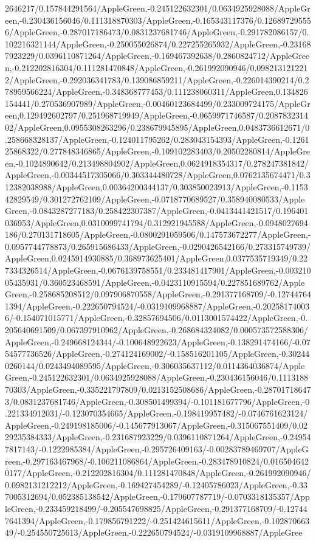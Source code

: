 {\begin{tikzternal}
{2646217/0.157844291564/AppleGreen,-0.245122632301/0.0634925928088/AppleGreen,-0.230436156046/0.111318870303/AppleGreen,-0.165343117376/0.126897295556/AppleGreen,-0.287017186473/0.0831237681746/AppleGreen,-0.291782086157/0.102216321144/AppleGreen,-0.250055026874/0.227255265932/AppleGreen,-0.231687923229/0.0396110871264/AppleGreen,-0.169467392638/0.2860824712/AppleGreen,-0.212202816304/0.111281470848/AppleGreen,-0.261992090946/0.0982131212212/AppleGreen,-0.292036341783/0.139086859211/AppleGreen,-0.226014390214/0.278959566224/AppleGreen,-0.348368777453/0.111238060311/AppleGreen,0.134826154441/0.270536907989/AppleGreen,-0.00460123684499/0.233009724175/AppleGreen,0.129492602797/0.251968719949/AppleGreen,-0.0659971746587/0.208783231402/AppleGreen,0.0955308263296/0.238679945895/AppleGreen,0.0483736612671/0.258668328137/AppleGreen,-0.124011795262/0.283043154393/AppleGreen,-0.126125868322/0.277848346865/AppleGreen,-0.109102283403/0.20502280814/AppleGreen,-0.1024890642/0.213498804902/AppleGreen,0.0624918354317/0.278247381842/AppleGreen,-0.00344517305066/0.303344480728/AppleGreen,0.0762135674471/0.312382038988/AppleGreen,0.00364200344137/0.303850023913/AppleGreen,-0.115342829549/0.301272762109/AppleGreen,-0.0718770689527/0.358940080533/AppleGreen,-0.0843287277183/0.258422307387/AppleGreen,-0.0413441421517/0.196401036953/AppleGreen,0.0310099741794/0.312921945588/AppleGreen,-0.0948027694186/0.270131718605/AppleGreen,-0.0800291059506/0.147573672277/AppleGreen,-0.0957744778873/0.265915686433/AppleGreen,-0.0290426542166/0.273315749739/AppleGreen,0.0245914930885/0.368973625401/AppleGreen,0.0377535719349/0.227334326514/AppleGreen,-0.0676139758551/0.233481417901/AppleGreen,-0.00321005435931/0.360523468591/AppleGreen,-0.0423110915594/0.227851689762/AppleGreen,-0.258685208512/0.097906870558/AppleGreen,-0.291377168709/-0.127447641394/AppleGreen,-0.222650794524/-0.0319109968887/AppleGreen,-0.202581740036/-0.154071015771/AppleGreen,-0.32857694506/0.0113001574422/AppleGreen,-0.205640691509/0.067397910962/AppleGreen,-0.268684324082/0.000573572588306/AppleGreen,-0.249668124344/-0.100648922623/AppleGreen,-0.138291474166/-0.0754577736526/AppleGreen,-0.274124169002/-0.158516201105/AppleGreen,-0.302440260144/0.0243494089595/AppleGreen,-0.306035637112/0.0114364036874/AppleGreen,-0.245122632301/0.0634925928088/AppleGreen,-0.230436156046/0.111318870303/AppleGreen,-0.335221797809/0.0213152508686/AppleGreen,-0.287017186473/0.0831237681746/AppleGreen,-0.308501499394/-0.101181677796/AppleGreen,-0.221334912031/-0.123070354665/AppleGreen,-0.198419957482/-0.0746761623124/AppleGreen,-0.249198185006/-0.145677913067/AppleGreen,-0.315067551409/0.0229235384333/AppleGreen,-0.231687923229/0.0396110871264/AppleGreen,-0.249547817143/-0.1222985384/AppleGreen,-0.295726409163/-0.00283789469707/AppleGreen,-0.297163467968/-0.106211086864/AppleGreen,-0.283478910824/0.0165046420177/AppleGreen,-0.212202816304/0.111281470848/AppleGreen,-0.261992090946/0.0982131212212/AppleGreen,-0.169427454289/-0.12405786023/AppleGreen,-0.337005312694/0.052385138542/AppleGreen,-0.179607787719/-0.0703318135357/AppleGreen,-0.233459218499/-0.205547698825/AppleGreen,-0.291377168709/-0.127447641394/AppleGreen,-0.179856791222/-0.251424615611/AppleGreen,-0.10287066349/-0.254550725613/AppleGreen,-0.222650794524/-0.0319109968887/AppleGree}
\end{tikzternal}}
